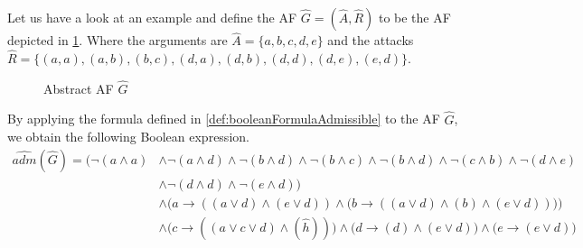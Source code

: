 \begin{example}
    Let us have a look at an example and define the AF $\hat{G}=(\hat{A},\hat{R})$ to be the AF depicted in \cref{af:algorithmEncodingsAdmissible}. Where the arguments are $\hat{A}=\{a, b, c, d, e\}$ and the attacks $\hat{R}=\big\{ (a,a), (a,b), (b,c), (d,a), (d,b), (d,d), (d, e), (e, d)\big\}$.

    \begin{figure}[H]
        \centering
        \caption{Abstract AF $\hat{G}$}
        \label{af:algorithmEncodingsAdmissible}
    \end{figure}

By applying the formula defined in \cref{def:booleanFormulaAdmissible} to the AF $\hat{G}$, we obtain the following Boolean expression.
\begin{align*}
    \hat{adm}(\hat{G}) = \big(
    \lnot (a \land a)
    & \land \lnot (a \land d) \land \lnot (b \land d) \land \lnot (b \land c) \land \lnot (b \land d) \land \lnot (c \land b) \land \lnot (d \land e) \\
    & \land \lnot (d \land d) \land \lnot (e \land d) \big) \\
    & \land \bigl( a \rightarrow ((a \lor d) \land (e \lor d)) \land \bigl( b \rightarrow ((a \lor d) \land (b) \land (e \lor d)) \bigl) \bigl)\\
    & \land \bigl( c \rightarrow ((a \lor c \lor d) \land (\hat{h})) \bigl) \land \bigl( d \rightarrow (d) \land (e \lor d) \bigl) \land \bigl( e \rightarrow (e \lor d) \bigl)
\end{align*}


\end{example}
